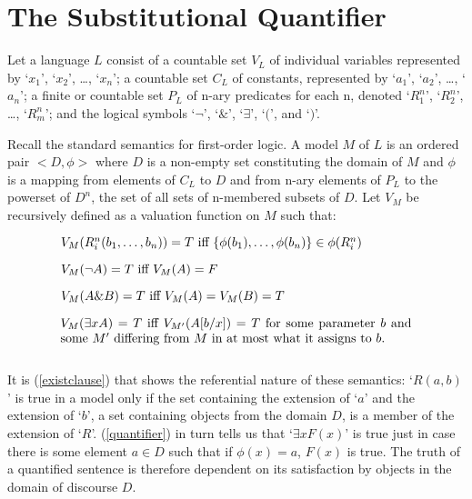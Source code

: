 \documentclass[12pt,a4paper]{article}
\newenvironment{te}
{\begin{singlespace}
\begin{equation}
\begin{minipage}[t]{0.8\linewidth}}
{\end{minipage}
\end{equation}
\end{singlespace}
\ignorespacesafterend}
\begin{document}
\section{The Substitutional Quantifier} 

Let a language $L$ consist of a countable set $V_L$ of individual
variables represented by `$x_1$', `$x_2$', \ldots, `$x_n$'; a
countable set $C_L$ of constants, represented by `$a_1$', `$a_2$',
\ldots, `$a_n$'; a finite or countable set $P_L$ of n-ary predicates for
each n, denoted `$R^n_1$', `$R^n_2$', \ldots, `$R^n_m$'; and the
logical symbols `$\neg$', `$\&$', `$\exists$', `$($', and `$)$'.

Recall the standard semantics for first-order logic.  A model $M$ of
$L$ is an ordered pair $<D,\phi>$ where $D$ is a non-empty set
constituting the domain of $M$ and $\phi$ is a mapping from elements
of $C_L$ to $D$ and from n-ary elements of $P_L$ to the powerset of $D^n$,
the set of all sets of n-membered subsets of $D$.  Let $V_M$ be
recursively defined as a valuation function on $M$ such that:

\begin{te}
  $V_M(R^n_i(b_1,\ldots ,b_n)) = T$ iff $\{ \phi(b_1),\ldots ,\phi(b_n) \} \in
  \phi(R^n_i)$
\label{existclause}
\end{te}

\begin{te}
  $V_M(\neg A) = T$ iff $V_M(A) = F$
\end{te}

\begin{te}
  $V_M(A \& B) = T$ iff $V_M(A) = V_M(B) = T$
\end{te}

\begin{te}
  $V_M(\exists xA) = T$ iff $V_{M'}(A[b/x]) = T$ for some
  parameter $b$ and some $M'$ differing from $M$ in at most what it
  assigns to $b$.\\
\label{quantifier}
\end{te}

It is (\ref{existclause}) that shows the referential nature of these
semantics: `$R(a,b)$' is true in a model only if the set containing the
extension of `$a$' and the extension of `$b$', a set containing objects
from the domain $D$, is a member of the extension of
`$R$'. (\ref{quantifier}) in turn tells us that `$\exists xF(x)$' is true
just in case there is some element $a \in D$ such that if $\phi(x) =
{a}$, $F(x)$ is true.  The truth of a quantified sentence is therefore
dependent on its satisfaction by objects in the domain of discourse $D$.
\end{document}
